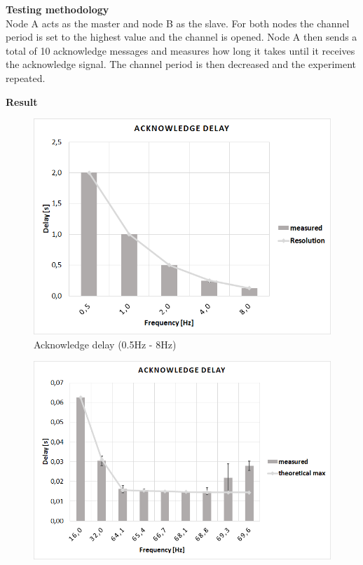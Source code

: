 \begin{description}
	\item{\textbf{Testing methodology}} \hfill \\ Node A acts as the master and node B as the slave. For both nodes the channel period is set to the highest value and the channel is opened. Node A then sends a total of 10 acknowledge messages and measures how long it takes until it receives the acknowledge signal. The channel period is then decreased and the experiment repeated.
	\item{\textbf{Result}} \hfill \\  
	\begin{figure}[H]
		\centering
		\includegraphics[scale=0.5]{content/images/exp4_norm.png}
		\caption{Acknowledge delay (0.5Hz - 8Hz)}\label{fig:exp3low}
	\end{figure}
	\begin{figure}[H]
		\centering
		\includegraphics[scale=0.5]{content/images/exp4_detail.png}

\end{figure}
\end{description}
